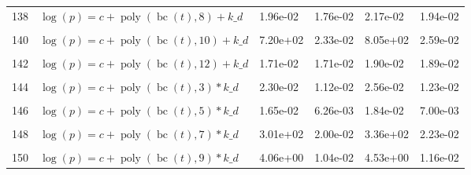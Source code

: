 \documentclass[12pt,a4paper]{article}
\DeclareMathOperator{\bc}{bc}
\DeclareMathOperator{\poly}{poly}
\begin{document}
\begin{longtable}[t]{ll>{\raggedleft\arraybackslash}p{2cm}>{\raggedleft\arraybackslash}p{2cm}>{\raggedleft\arraybackslash}p{2cm}>{\raggedleft\arraybackslash}p{2cm}}
138 & $\log(p) = c + \poly\left( \bc(t), 8 \right) + k\_d$ & 1.96e-02 & 1.76e-02 & 2.17e-02 & 1.94e-02\\
\cellcolor{gray!6}{139} & \cellcolor{gray!6}{$\log(p) = c + \poly\left( \bc(t), 9 \right) + k\_d$} & \cellcolor{gray!6}{2.43e-02} & \cellcolor{gray!6}{2.14e-02} & \cellcolor{gray!6}{2.69e-02} & \cellcolor{gray!6}{2.38e-02}\\
140 & $\log(p) = c + \poly\left( \bc(t), 10 \right) + k\_d$ & 7.20e+02 & 2.33e-02 & 8.05e+02 & 2.59e-02\\
\cellcolor{gray!6}{141} & \cellcolor{gray!6}{$\log(p) = c + \poly\left( \bc(t), 11 \right) + k\_d$} & \cellcolor{gray!6}{1.89e-02} & \cellcolor{gray!6}{1.82e-02} & \cellcolor{gray!6}{2.09e-02} & \cellcolor{gray!6}{2.01e-02}\\
142 & $\log(p) = c + \poly\left( \bc(t), 12 \right) + k\_d$ & 1.71e-02 & 1.71e-02 & 1.90e-02 & 1.89e-02\\
\cellcolor{gray!6}{143} & \cellcolor{gray!6}{$\log(p) = c + \poly\left( \bc(t), 13 \right) + k\_d$} & \cellcolor{gray!6}{1.72e-02} & \cellcolor{gray!6}{1.71e-02} & \cellcolor{gray!6}{1.90e-02} & \cellcolor{gray!6}{1.89e-02}\\
144 & $\log(p) = c + \poly\left( \bc(t), 3 \right) * k\_d$ & 2.30e-02 & 1.12e-02 & 2.56e-02 & 1.23e-02\\
\cellcolor{gray!6}{145} & \cellcolor{gray!6}{$\log(p) = c + \poly\left( \bc(t), 4 \right) * k\_d$} & \cellcolor{gray!6}{2.29e-02} & \cellcolor{gray!6}{2.18e-02} & \cellcolor{gray!6}{2.55e-02} & \cellcolor{gray!6}{2.43e-02}\\
146 & $\log(p) = c + \poly\left( \bc(t), 5 \right) * k\_d$ & 1.65e-02 & 6.26e-03 & 1.84e-02 & 7.00e-03\\
\cellcolor{gray!6}{147} & \cellcolor{gray!6}{$\log(p) = c + \poly\left( \bc(t), 6 \right) * k\_d$} & \cellcolor{gray!6}{7.48e-03} & \cellcolor{gray!6}{6.43e-03} & \cellcolor{gray!6}{8.35e-03} & \cellcolor{gray!6}{7.18e-03}\\
148 & $\log(p) = c + \poly\left( \bc(t), 7 \right) * k\_d$ & 3.01e+02 & 2.00e-02 & 3.36e+02 & 2.23e-02\\
\cellcolor{gray!6}{149} & \cellcolor{gray!6}{$\log(p) = c + \poly\left( \bc(t), 8 \right) * k\_d$} & \cellcolor{gray!6}{2.66e-02} & \cellcolor{gray!6}{1.91e-02} & \cellcolor{gray!6}{2.96e-02} & \cellcolor{gray!6}{2.13e-02}\\
150 & $\log(p) = c + \poly\left( \bc(t), 9 \right) * k\_d$ & 4.06e+00 & 1.04e-02 & 4.53e+00 & 1.16e-02\\

\end{longtable}
\end{document}
